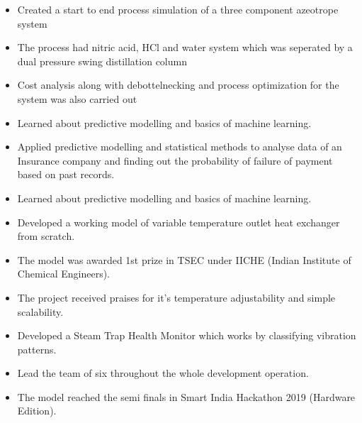\documentclass[10pt,a4paper,ragged2e]{altacv}
\begin{document}
 
\begin{itemize}
\item Created a start to end process simulation of a three component azeotrope system
\item The process had nitric acid, HCl and water system which was seperated by a dual pressure swing distillation column
\item Cost analysis along with debottelnecking and process optimization for the system was also carried out
\end{itemize}
\divider

 
\begin{itemize}
\item Learned about predictive modelling and basics of machine learning.
\item Applied predictive modelling and statistical methods to analyse  data of an Insurance company and finding out the probability of failure of payment based on past records.
\item Learned about predictive modelling and basics of machine learning.
\end{itemize}
\divider

 
\begin{itemize}
\item Developed a working model of variable temperature outlet heat exchanger from scratch.
\item The model was awarded 1st prize in TSEC under IICHE (Indian Institute of Chemical Engineers).
\item The project received praises for it's temperature adjustability and simple scalability.
\end{itemize}
\divider

 
\begin{itemize}
\item Developed a Steam Trap Health Monitor which works by classifying vibration patterns.
\item Lead the team of six throughout the whole development operation.
\item The model reached the semi finals in Smart India Hackathon 2019 (Hardware Edition).
\end{itemize}
\divider


\end{document}
